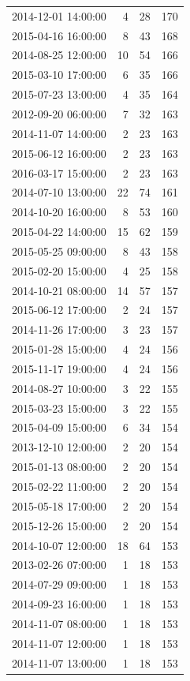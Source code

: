 \begin{tabular}{lrrr}
2014-12-01 14:00:00 & 4 & 28 & 170 \\
2015-04-16 16:00:00 & 8 & 43 & 168 \\
2014-08-25 12:00:00 & 10 & 54 & 166 \\
2015-03-10 17:00:00 & 6 & 35 & 166 \\
2015-07-23 13:00:00 & 4 & 35 & 164 \\
2012-09-20 06:00:00 & 7 & 32 & 163 \\
2014-11-07 14:00:00 & 2 & 23 & 163 \\
2015-06-12 16:00:00 & 2 & 23 & 163 \\
2016-03-17 15:00:00 & 2 & 23 & 163 \\
2014-07-10 13:00:00 & 22 & 74 & 161 \\
2014-10-20 16:00:00 & 8 & 53 & 160 \\
2015-04-22 14:00:00 & 15 & 62 & 159 \\
2015-05-25 09:00:00 & 8 & 43 & 158 \\
2015-02-20 15:00:00 & 4 & 25 & 158 \\
2014-10-21 08:00:00 & 14 & 57 & 157 \\
2015-06-12 17:00:00 & 2 & 24 & 157 \\
2014-11-26 17:00:00 & 3 & 23 & 157 \\
2015-01-28 15:00:00 & 4 & 24 & 156 \\
2015-11-17 19:00:00 & 4 & 24 & 156 \\
2014-08-27 10:00:00 & 3 & 22 & 155 \\
2015-03-23 15:00:00 & 3 & 22 & 155 \\
2015-04-09 15:00:00 & 6 & 34 & 154 \\
2013-12-10 12:00:00 & 2 & 20 & 154 \\
2015-01-13 08:00:00 & 2 & 20 & 154 \\
2015-02-22 11:00:00 & 2 & 20 & 154 \\
2015-05-18 17:00:00 & 2 & 20 & 154 \\
2015-12-26 15:00:00 & 2 & 20 & 154 \\
2014-10-07 12:00:00 & 18 & 64 & 153 \\
2013-02-26 07:00:00 & 1 & 18 & 153 \\
2014-07-29 09:00:00 & 1 & 18 & 153 \\
2014-09-23 16:00:00 & 1 & 18 & 153 \\
2014-11-07 08:00:00 & 1 & 18 & 153 \\
2014-11-07 12:00:00 & 1 & 18 & 153 \\
2014-11-07 13:00:00 & 1 & 18 & 153 \\

\end{tabular}

